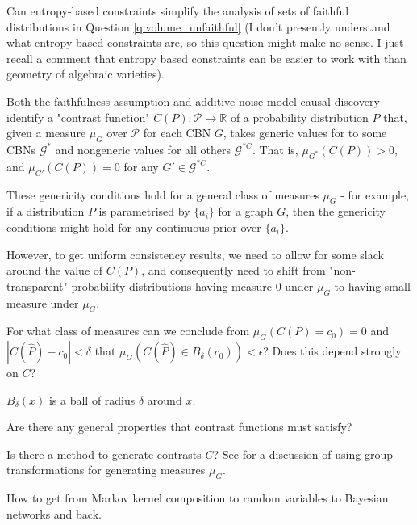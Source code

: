 \begin{question}
    Can entropy-based constraints simplify the analysis of sets of faithful distributions in Question \ref{q:volume_unfaithful} (I don't presently understand what entropy-based constraints are, so this question might make no sense. I just recall a comment that entropy based constraints can be easier to work with than geometry of algebraic varieties).
\end{question}

Both the faithfulness assumption and additive noise model causal discovery identify a "contrast function" $C(P):\mathcal{P}\to\mathbb{R}$ of a probability distribution $P$ that, given a measure $\mu_G$ over $\mathcal{P}$ for each CBN $G$, takes generic values for to some CBNs $\mathcal{G}^*$ and nongeneric values for all others $\mathcal{G}^{*C}$. That is, $\mu_{G^*}(C(P))>0$, and $\mu_{G'}(C(P))=0$ for any $G'\in\mathcal{G}^{*C}$.

\begin{question}\label{q:generalised_genericity}
    These genericity conditions hold for a general class of measures $\mu_G$ - for example, if a distribution $P$ is parametrised by $\{a_i\}$ for a graph $G$, then the genericity conditions might hold for any continuous prior over $\{a_i\}$.
    
    However, to get uniform consistency results, we need to allow for some slack around the value of $C(P)$, and consequently need to shift from "non-transparent" probability distributions having measure 0 under $\mu_G$ to having small measure under $\mu_G$.
    
    For what class of measures can we conclude from $\mu_G(C(P)=c_0)=0$ and $|C(\hat{P})-c_0|<\delta$ that $\mu_G(C(\hat{P})\in B_\delta (c_0)) < \epsilon$? Does this depend strongly on $C$?
    
    $B_\delta(x)$ is a ball of radius $\delta$ around $x$.
\end{question}
    
\begin{question}
    Are there any general properties that contrast functions must satisfy?
\end{question}

\begin{question}
    Is there a method to generate contrasts $C$? See \cite{besserve_group_2017} for a discussion of using group transformations for generating measures $\mu_G$.
\end{question}


\begin{question}
    How to get from Markov kernel composition to random variables to Bayesian networks and back.
\end{question}